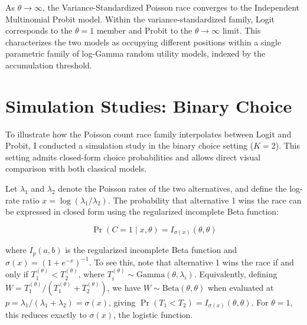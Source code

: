 \documentclass[
  man,
  floatsintext,
  longtable,
  a4paper,
  nolmodern,
  notxfonts,
  notimes,
  colorlinks=true,linkcolor=blue,citecolor=blue,urlcolor=blue]{apa7}
\begin{document}
\begin{tcolorbox}[enhanced jigsaw, colframe=quarto-callout-note-color-frame, coltitle=black, leftrule=.75mm, opacitybacktitle=0.6, colback=white, arc=.35mm, left=2mm, opacityback=0, toptitle=1mm, rightrule=.15mm, bottomtitle=1mm, breakable, colbacktitle=quarto-callout-note-color!10!white, titlerule=0mm, bottomrule=.15mm, title={Result 3 (Probit Limit)}, toprule=.15mm]

As \(\theta \to \infty\), the Variance-Standardized Poisson race
converges to the Independent Multinomial Probit model. Within the
variance-standardized family, Logit corresponds to the \(\theta=1\)
member and Probit to the \(\theta \to \infty\) limit. This characterizes
the two models as occupying different positions within a single
parametric family of log-Gamma random utility models, indexed by the
accumulation threshold.

\end{tcolorbox}

\section{Simulation Studies: Binary
Choice}\label{sec-binary-simulations}

To illustrate how the Poisson count race family interpolates between
Logit and Probit, I conducted a simulation study in the binary choice
setting (\(K=2\)). This setting admits closed-form choice probabilities
and allows direct visual comparison with both classical models.

Let \(\lambda_1\) and \(\lambda_2\) denote the Poisson rates of the two
alternatives, and define the log-rate ratio
\(x = \log(\lambda_1/\lambda_2)\). The probability that alternative 1
wins the race can be expressed in closed form using the regularized
incomplete Beta function:

\[
\Pr(C = 1 \mid x, \theta) = I_{\sigma(x)}(\theta, \theta)
\]

where \(I_p(a, b)\) is the regularized incomplete Beta function and
\(\sigma(x) = (1 + e^{-x})^{-1}\). To see this, note that alternative 1
wins the race if and only if \(T_1^{(\theta)} < T_2^{(\theta)}\), where
\(T_i^{(\theta)} \sim \text{Gamma}(\theta, \lambda_i)\). Equivalently,
defining \(W = T_1^{(\theta)} / (T_1^{(\theta)} + T_2^{(\theta)})\), we
have \(W \sim \text{Beta}(\theta, \theta)\) when evaluated at
\(p = \lambda_1 / (\lambda_1 + \lambda_2) = \sigma(x)\), giving
\(\Pr(T_1 < T_2) = I_{\sigma(x)}(\theta, \theta)\). For \(\theta = 1\),
this reduces exactly to \(\sigma(x)\), the logistic function.
\end{document}
